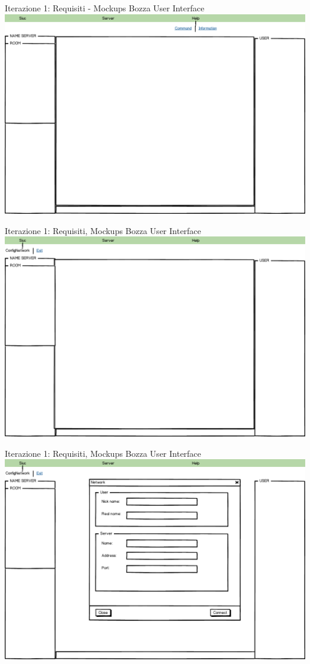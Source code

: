 \documentclass[t]{beamer} %
\begin{document}
\begin{frame} {Iterazione 1: Requisiti  - Mockups Bozza User Interface}
    \includegraphics[scale=0.28]{image_mockups/03_snuc_menu_help.png}{\centering}
\end{frame}

\begin{frame} {Iterazione 1: Requisiti, Mockups Bozza User Interface}
    \includegraphics[scale=0.28]{image_mockups/04_snuc_menu_snuc.png}{\centering}
\end{frame}

\begin{frame} {Iterazione 1: Requisiti, Mockups Bozza User Interface}
    \includegraphics[scale=0.28]{image_mockups/05_snuc_config_network.png}{\centering}
\end{frame}
\end{document}
